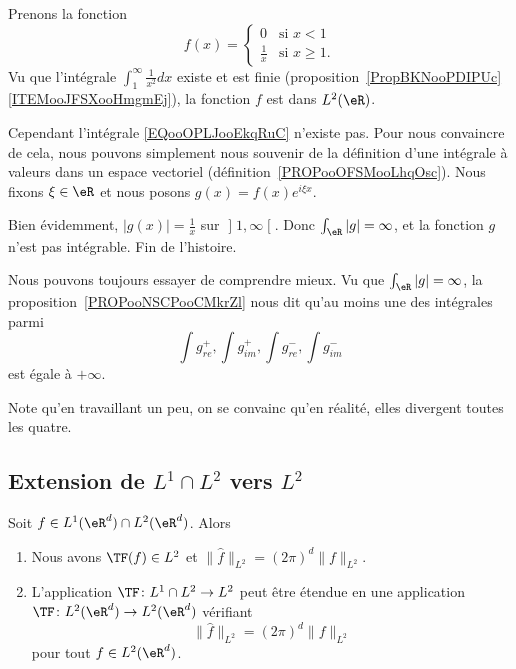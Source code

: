 \begin{example}     \label{EXooSWCHooTdHTsl}
	Prenons la fonction
	\begin{equation}
		f(x)=\begin{cases}
			0             & \text{si } x<1      \\
			\frac{1}{ x } & \text{si } x\geq 1.
		\end{cases}
	\end{equation}
	Vu que l'intégrale \( \int_1^{\infty}\frac{1}{ x^2 }dx\) existe et est finie (proposition~\ref{PropBKNooPDIPUc}\ref{ITEMooJFSXooHmgmEj}), la fonction \( f\) est dans \( L^2(\eR)\).

	Cependant l'intégrale \eqref{EQooOPLJooEkqRuC} n'existe pas. Pour nous convaincre de cela, nous pouvons simplement nous souvenir de la définition d'une intégrale à valeurs dans un espace vectoriel (définition~\ref{PROPooOFSMooLhqOsc}). Nous fixons \( \xi\in \eR\) et nous posons \( g(x)=f(x) e^{i\xi x}\).

	Bien évidemment, \( | g(x) |=\frac{1}{ x }\) sur \( \mathopen] 1 , \infty \mathclose[\). Donc \( \int_{\eR}| g |=\infty\), et la fonction \( g\) n'est pas intégrable. Fin de l'histoire.

	Nous pouvons toujours essayer de comprendre mieux. Vu que \( \int_{\eR}| g |=\infty\), la proposition~\ref{PROPooNSCPooCMkrZl} nous dit qu'au moins une des intégrales parmi
	\begin{equation}
		\int g^+_{re}, \int g^+_{im},\int g^-_{re},\int g^-_{im}
	\end{equation}
	est égale à \( +\infty\).

	Note qu'en travaillant un peu, on se convainc qu'en réalité, elles divergent toutes les quatre.
\end{example}

\subsection{Extension de \( L^1\cap L^2\) vers \( L^2\)}

\begin{theorem}       \label{THOooJLCDooAjTvJf}
	Soit \( f\in L^1(\eR^d)\cap L^2(\eR^d)\). Alors
	\begin{enumerate}
		\item
		      Nous avons \( \TF(f)\in L^2\) et \( \| \hat f\|_{L^2}= (2\pi)^d  \| f \|_{L^2}\).
		\item
		      L'application \( \TF\colon L^1\cap L^2\to L^2\) peut être étendue en une application \( \TF\colon L^2(\eR^d)\to L^2(\eR^d)\) vérifiant
		      \begin{equation}
			      \| \hat f \|_{L^2}=(2\pi)^d\| f \|_{L^2}
		      \end{equation}
		      pour tout \( f\in L^2(\eR^d)\).
	\end{enumerate}
\end{theorem}

